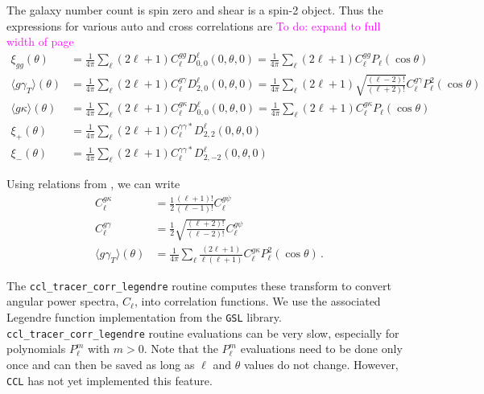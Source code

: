 \documentclass[\docopts]{\docclass}
\newcommand{\todo}[1]{\textcolor{magenta}{To do: #1}}
\newcommand{\ccl}{{\tt CCL}\xspace}
\begin{document}
The galaxy number count is spin zero and shear is a spin-2 object. Thus the expressions for various auto and cross correlations are \todo{expand to full width of page}
\begin{align}
  \xi_{gg}(\theta)&=\frac{1}{4\pi}\sum_{\ell}{(2\ell+1)}C_{\ell}^{gg}D^{\ell}_{0,0}(0,\theta,0)=
  \frac{1}{4\pi}\sum_{\ell}{(2\ell+1)}C_{\ell}^{gg}P_{\ell}(\cos\theta)\label{eq:xi_gg_D}\\
  \langle g\gamma_T\rangle(\theta)&=
  \frac{1}{4\pi}\sum_{\ell}{(2\ell+1)}C_{\ell}^{g\gamma}D^{\ell}_{2,0}(0,\theta,0)=
  \frac{1}{4\pi}\sum_{\ell}(2\ell+1)\sqrt{\frac{(\ell-2)!}{(\ell+2)!}}C_{\ell}^{g\gamma}
  P_{\ell}^2(\cos\theta)\label{eq:xi_g_gamma_D}\\
  \langle g\kappa\rangle(\theta)&=
  \frac{1}{4\pi}\sum_{\ell}{(2\ell+1)}C_{\ell}^{g\kappa}D^{\ell}_{0,0}(0,\theta,0)=
  \frac{1}{4\pi}\sum_{\ell}(2\ell+1)C_{\ell}^{g\kappa}
  P_{\ell}(\cos\theta)\label{eq:xi_g_kappa_D}\\
  \xi_+(\theta)&=\frac{1}{4\pi}\sum_{\ell}{(2\ell+1)}C_{\ell}^{\gamma\gamma*}
  D^{\ell}_{2,2}(0,\theta,0)\label{eq:xi_p_D}\\
  \xi_-(\theta)&=\frac{1}{4\pi}\sum_{\ell}{(2\ell+1)}C_{\ell}^{\gamma\gamma*}
  D^{\ell}_{2,-2}(0,\theta,0)
  \label{eq:xi_m_D}
\end{align}

Using relations from \cite{Kilbinger2017}, we can write
\begin{align}
  C_{\ell}^{g\kappa}&={\frac{1}{2}\frac{(\ell+1)!}{(\ell-1)!}}C_{\ell}^{g\psi}\\
  C_{\ell}^{g\gamma}&=\frac{1}{2}\sqrt{\frac{(\ell+2)!}{(\ell-2)!}}C_{\ell}^{g\psi}
  \\ \langle g\gamma_T\rangle(\theta)&
  =\frac{1}{4\pi}\sum_{\ell}\frac{(2\ell+1)}{\ell(\ell+1)}C_{\ell}^{g\kappa}P_{\ell}^2(\cos\theta)
  \label{eq:xi_g_gamma}\,.
\end{align}

The {\tt ccl\_tracer\_corr\_legendre} routine computes these transform to convert angular power
spectra, $C_\ell$, into correlation functions. We use the associated Legendre function
implementation from the {\tt GSL} library. {\tt ccl\_tracer\_corr\_legendre} routine evaluations
can be very slow, especially for polynomials $P_\ell^m$ with $m>0$. Note that the $P_\ell^m$
evaluations need to be done only once and can then be saved as long as $\ell$ and $\theta$ values
do not change. However, \ccl has not yet implemented this feature.
\end{document}
